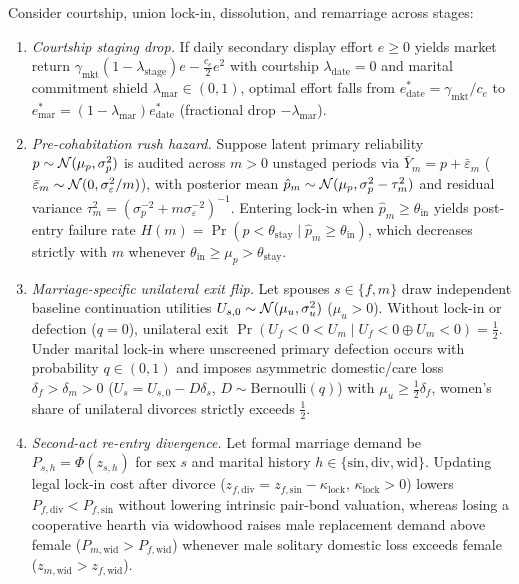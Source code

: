 \begin{proposition}\label{prop:lifecycle}
Consider courtship, union lock-in, dissolution, and remarriage across stages:
\begin{enumerate}[leftmargin=1.5em,itemsep=1pt,topsep=2pt]
\item[(i)] \emph{Courtship staging drop.} If daily secondary display effort $e\ge 0$ yields market return $\gamma_{\mathrm{mkt}}(1-\lambda_{\mathrm{stage}})e-\tfrac{c_e}{2}e^2$ with courtship $\lambda_{\mathrm{date}}=0$ and marital commitment shield $\lambda_{\mathrm{mar}}\in(0,1)$, optimal effort falls from $e_{\mathrm{date}}^*=\gamma_{\mathrm{mkt}}/c_e$ to $e_{\mathrm{mar}}^*=(1-\lambda_{\mathrm{mar}})e_{\mathrm{date}}^*$ (fractional drop $-\lambda_{\mathrm{mar}}$).
\item[(ii)] \emph{Pre-cohabitation rush hazard.} Suppose latent primary reliability $p\sim\mathcal{N}(\mu_p,\sigma_p^2)$ is audited across $m>0$ unstaged periods via $\bar Y_m=p+\bar\varepsilon_m$ ($\bar\varepsilon_m\sim\mathcal{N}(0,\sigma_\varepsilon^2/m)$), with posterior mean $\hat p_m\sim\mathcal{N}(\mu_p,\sigma_p^2-\tau_m^2)$ and residual variance $\tau_m^2=(\sigma_p^{-2}+m\sigma_\varepsilon^{-2})^{-1}$. Entering lock-in when $\hat p_m\ge\theta_{\mathrm{in}}$ yields post-entry failure rate $H(m)=\Pr(p<\theta_{\mathrm{stay}}\mid\hat p_m\ge\theta_{\mathrm{in}})$, which decreases strictly with $m$ whenever $\theta_{\mathrm{in}}\ge\mu_p>\theta_{\mathrm{stay}}$.
\item[(iii)] \emph{Marriage-specific unilateral exit flip.} Let spouses $s\in\{f,m\}$ draw independent baseline continuation utilities $U_{s,0}\sim\mathcal{N}(\mu_u,\sigma_u^2)$ ($\mu_u>0$). Without lock-in or defection ($q=0$), unilateral exit $\Pr(U_f<0<U_m\mid U_f<0\oplus U_m<0)=\tfrac12$. Under marital lock-in where unscreened primary defection occurs with probability $q\in(0,1)$ and imposes asymmetric domestic/care loss $\delta_f>\delta_m>0$ ($U_s=U_{s,0}-D\delta_s$, $D\sim\mathrm{Bernoulli}(q)$) with $\mu_u\ge\tfrac12\delta_f$, women's share of unilateral divorces strictly exceeds $\tfrac12$.
\item[(iv)] \emph{Second-act re-entry divergence.} Let formal marriage demand be $P_{s,h}=\Phi(z_{s,h})$ for sex $s$ and marital history $h\in\{\mathrm{sin},\mathrm{div},\mathrm{wid}\}$. Updating legal lock-in cost after divorce ($z_{f,\mathrm{div}}=z_{f,\mathrm{sin}}-\kappa_{\mathrm{lock}}$, $\kappa_{\mathrm{lock}}>0$) lowers $P_{f,\mathrm{div}}<P_{f,\mathrm{sin}}$ without lowering intrinsic pair-bond valuation, whereas losing a cooperative hearth via widowhood raises male replacement demand above female ($P_{m,\mathrm{wid}}>P_{f,\mathrm{wid}}$) whenever male solitary domestic loss exceeds female ($z_{m,\mathrm{wid}}>z_{f,\mathrm{wid}}$).
\end{enumerate}
\end{proposition}

